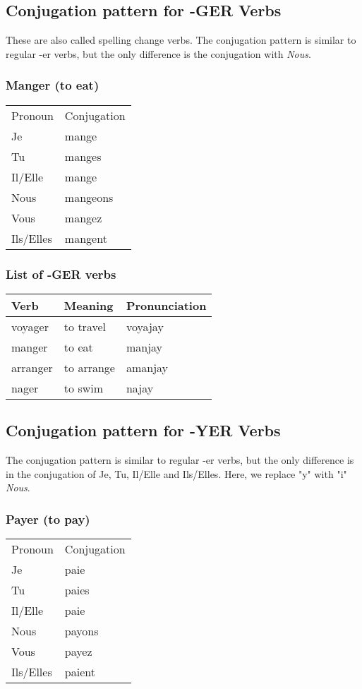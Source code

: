 \subsection{Conjugation pattern for -GER Verbs}
These are also called spelling change verbs. The conjugation pattern is
similar to regular -er verbs, but the only difference is the conjugation
with \emph{Nous}.

\subsubsection{Manger (to eat)}
\begin{tabular}{| l | l |}
\hline
Pronoun 	& 	Conjugation	\\
Je		&	mange		\\
Tu		&	manges		\\
Il/Elle		&	mange		\\
Nous		&	mangeons	\\
Vous		&	mangez		\\
Ils/Elles	&	mangent		\\
\hline
\end{tabular}

\subsubsection{List of -GER verbs}
\begin{longtable}{| l | l | l |}
\hline
Verb 		& Meaning 		& Pronunciation	\\
\hline
\endhead
voyager 	& to travel		& voyajay	\\  \hline
manger		& to eat		& manjay	\\  \hline
arranger	& to arrange	& amanjay	\\  \hline
nager       & to swim       & najay		\\  \hline
\end{longtable}

\subsection{Conjugation pattern for -YER Verbs}
The conjugation pattern is similar to regular -er verbs, but the only difference is in the conjugation of 
Je, Tu, Il/Elle and Ils/Elles. Here, we replace "y" with "i" \emph{Nous}.

\subsubsection{Payer (to pay)}
\begin{tabular}{| l | l |}
\hline
Pronoun 	& 	Conjugation	\\
Je		&	paie		\\
Tu		&	paies		\\
Il/Elle		&	paie		\\
Nous		&	payons	\\
Vous		&	payez		\\
Ils/Elles	&	paient		\\
\hline
\end{tabular}

